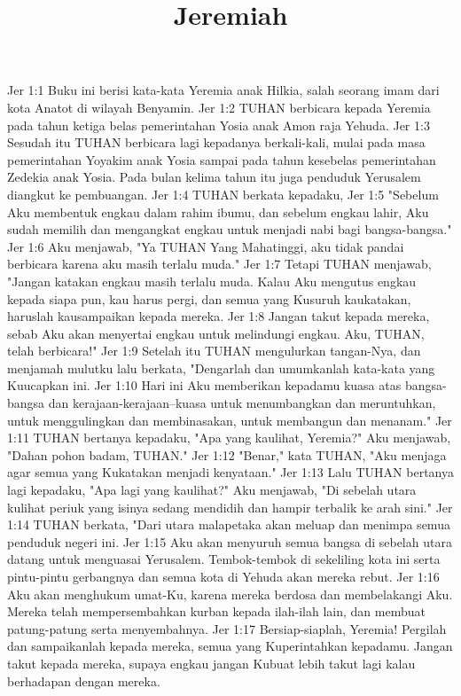 

\title{Jeremiah}

Jer 1:1  Buku ini berisi kata-kata Yeremia anak Hilkia, salah seorang imam dari kota Anatot di wilayah Benyamin.
Jer 1:2  TUHAN berbicara kepada Yeremia pada tahun ketiga belas pemerintahan Yosia anak Amon raja Yehuda.
Jer 1:3  Sesudah itu TUHAN berbicara lagi kepadanya berkali-kali, mulai pada masa pemerintahan Yoyakim anak Yosia sampai pada tahun kesebelas pemerintahan Zedekia anak Yosia. Pada bulan kelima tahun itu juga penduduk Yerusalem diangkut ke pembuangan.
Jer 1:4  TUHAN berkata kepadaku,
Jer 1:5  "Sebelum Aku membentuk engkau dalam rahim ibumu, dan sebelum engkau lahir, Aku sudah memilih dan mengangkat engkau untuk menjadi nabi bagi bangsa-bangsa."
Jer 1:6  Aku menjawab, "Ya TUHAN Yang Mahatinggi, aku tidak pandai berbicara karena aku masih terlalu muda."
Jer 1:7  Tetapi TUHAN menjawab, "Jangan katakan engkau masih terlalu muda. Kalau Aku mengutus engkau kepada siapa pun, kau harus pergi, dan semua yang Kusuruh kaukatakan, haruslah kausampaikan kepada mereka.
Jer 1:8  Jangan takut kepada mereka, sebab Aku akan menyertai engkau untuk melindungi engkau. Aku, TUHAN, telah berbicara!"
Jer 1:9  Setelah itu TUHAN mengulurkan tangan-Nya, dan menjamah mulutku lalu berkata, "Dengarlah dan umumkanlah kata-kata yang Kuucapkan ini.
Jer 1:10  Hari ini Aku memberikan kepadamu kuasa atas bangsa-bangsa dan kerajaan-kerajaan--kuasa untuk menumbangkan dan meruntuhkan, untuk menggulingkan dan membinasakan, untuk membangun dan menanam."
Jer 1:11  TUHAN bertanya kepadaku, "Apa yang kaulihat, Yeremia?" Aku menjawab, "Dahan pohon badam, TUHAN."
Jer 1:12  "Benar," kata TUHAN, "Aku menjaga agar semua yang Kukatakan menjadi kenyataan."
Jer 1:13  Lalu TUHAN bertanya lagi kepadaku, "Apa lagi yang kaulihat?" Aku menjawab, "Di sebelah utara kulihat periuk yang isinya sedang mendidih dan hampir terbalik ke arah sini."
Jer 1:14  TUHAN berkata, "Dari utara malapetaka akan meluap dan menimpa semua penduduk negeri ini.
Jer 1:15  Aku akan menyuruh semua bangsa di sebelah utara datang untuk menguasai Yerusalem. Tembok-tembok di sekeliling kota ini serta pintu-pintu gerbangnya dan semua kota di Yehuda akan mereka rebut.
Jer 1:16  Aku akan menghukum umat-Ku, karena mereka berdosa dan membelakangi Aku. Mereka telah mempersembahkan kurban kepada ilah-ilah lain, dan membuat patung-patung serta menyembahnya.
Jer 1:17  Bersiap-siaplah, Yeremia! Pergilah dan sampaikanlah kepada mereka, semua yang Kuperintahkan kepadamu. Jangan takut kepada mereka, supaya engkau jangan Kubuat lebih takut lagi kalau berhadapan dengan mereka.
